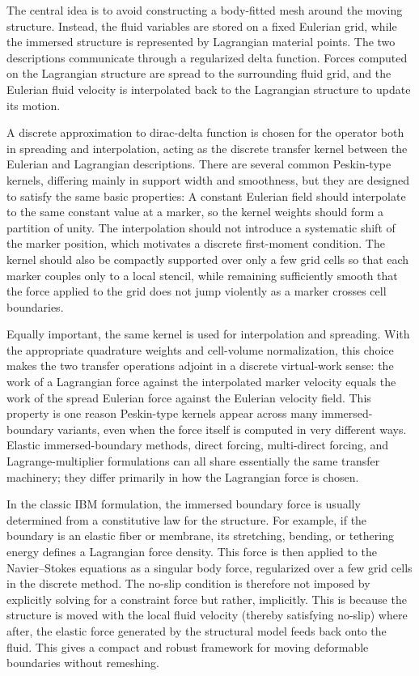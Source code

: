 The central idea is to avoid constructing a body-fitted mesh around the moving
structure. Instead, the fluid variables are stored on a fixed Eulerian grid,
while the immersed structure is represented by Lagrangian material points. The
two descriptions communicate through a regularized delta function. Forces
computed on the Lagrangian structure are spread to the surrounding fluid grid,
and the Eulerian fluid velocity is interpolated back to the Lagrangian
structure to update its motion.

A discrete approximation to dirac-delta function is chosen for the operator
both in spreading and interpolation, acting as the discrete transfer kernel
between the Eulerian and Lagrangian descriptions. There are several common
Peskin-type kernels, differing mainly in support width and smoothness, but they
are designed to satisfy the same basic properties: A constant Eulerian field
should interpolate to the same constant value at a marker, so the kernel
weights should form a partition of unity. The interpolation should not
introduce a systematic shift of the marker position, which motivates a discrete
first-moment condition. The kernel should also be compactly supported over only
a few grid cells so that each marker couples only to a local stencil, while
remaining sufficiently smooth that the force applied to the grid does not jump
violently as a marker crosses cell boundaries.

Equally important, the same kernel is used for interpolation and spreading.
With the appropriate quadrature weights and cell-volume normalization, this
choice makes the two transfer operations adjoint in a discrete virtual-work
sense: the work of a Lagrangian force against the interpolated marker velocity
equals the work of the spread Eulerian force against the Eulerian velocity
field. This property is one reason Peskin-type kernels appear across many
immersed-boundary variants, even when the force itself is computed in very
different ways. Elastic immersed-boundary methods, direct forcing, multi-direct
forcing, and Lagrange-multiplier formulations can all share essentially the
same transfer machinery; they differ primarily in how the Lagrangian force is
chosen.

In the classic IBM formulation, the immersed boundary force is usually
determined from a constitutive law for the structure. For example, if the
boundary is an elastic fiber or membrane, its stretching, bending, or tethering
energy defines a Lagrangian force density. This force is then applied to the
Navier--Stokes equations as a singular body force, regularized over a few grid
cells in the discrete method. The no-slip condition is therefore not imposed by
explicitly solving for a constraint force but rather, implicitly. This is
because the structure is moved with the local fluid velocity (thereby
satisfying no-slip) where after, the elastic force generated by the structural
model feeds back onto the fluid. This gives a compact and robust framework for
moving deformable boundaries without remeshing.

